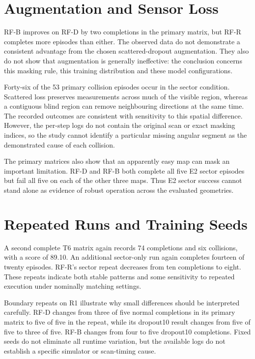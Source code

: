 \section{Augmentation and Sensor Loss}
RF-B improves on RF-D by two completions in the primary matrix, but RF-R
completes more episodes than either. The observed data do not demonstrate a
consistent advantage from the chosen scattered-dropout augmentation. They
also do not show that augmentation is generally ineffective: the conclusion
concerns this masking rule, this training distribution and these model
configurations.

Forty-six of the 53 primary collision episodes occur in the sector condition.
Scattered loss preserves measurements across much of the visible region,
whereas a contiguous blind region can remove neighbouring directions at the
same time. The recorded outcomes are consistent with sensitivity to this
spatial difference. However, the per-step logs do not contain the original
scan or exact masking indices, so the study cannot identify a particular
missing angular segment as the demonstrated cause of each collision.

The primary matrices also show that an apparently easy map can mask an
important limitation. RF-D and RF-B both complete all five E2 sector episodes
but fail all five on each of the other three maps. Thus E2 sector success
cannot stand alone as evidence of robust operation across the evaluated
geometries.

\section{Repeated Runs and Training Seeds}
A second complete T6 matrix again records 74 completions and six collisions,
with a score of 89.10. An additional sector-only run again completes fourteen
of twenty episodes. RF-R's sector repeat decreases from ten completions to
eight. These repeats indicate both stable patterns and some sensitivity to
repeated execution under nominally matching settings.

Boundary repeats on R1 illustrate why small differences should be interpreted
carefully. RF-D changes from three of five normal completions in its primary
matrix to five of five in the repeat, while its dropout10 result changes from
five of five to three of five. RF-B changes from four to five dropout10
completions. Fixed seeds do not eliminate all runtime variation, but the
available logs do not establish a specific simulator or scan-timing cause.

